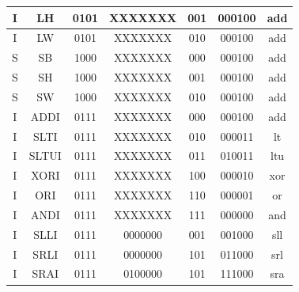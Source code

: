 \documentclass[12pt,a4paper]{report}
\begin{document}
\begin{table}[!ht]
\begin{tabular}{|c|c|c|c|c|c|c|}
		I                                                              & LH                 & 0101  & XXXXXXX & 001    & 000100 & add          \\ \hline
		I                                                              & LW                 & 0101  & XXXXXXX & 010    & 000100 & add          \\ \hline
		S                                                              & SB                 & 1000  & XXXXXXX & 000    & 000100 & add          \\ \hline
		S                                                              & SH                 & 1000  & XXXXXXX & 001    & 000100 & add          \\ \hline
		S                                                              & SW                 & 1000  & XXXXXXX & 010    & 000100 & add          \\ \hline
		I                                                              & ADDI               & 0111  & XXXXXXX & 000    & 000100 & add          \\ \hline
		I                                                              & SLTI               & 0111  & XXXXXXX & 010    & 000011 & lt           \\ \hline
		I                                                              & SLTUI              & 0111  & XXXXXXX & 011    & 010011 & ltu          \\ \hline
		I                                                              & XORI               & 0111  & XXXXXXX & 100    & 000010 & xor          \\ \hline
		I                                                              & ORI        & 0111  & XXXXXXX & 110    & 000001 & or           \\ \hline
		I                                                              & ANDI               & 0111  & XXXXXXX & 111    & 000000 & and          \\ \hline
		I                                                              & SLLI               & 0111  & 0000000 & 001    & 001000 & sll          \\ \hline
		I                                                              & SRLI               & 0111  & 0000000 & 101    & 011000 & srl          \\ \hline
		I                                                              & SRAI               & 0111  & 0100000 & 101    & 111000 & sra          \\ \hline

\end{tabular}
\end{table}
\end{document}
